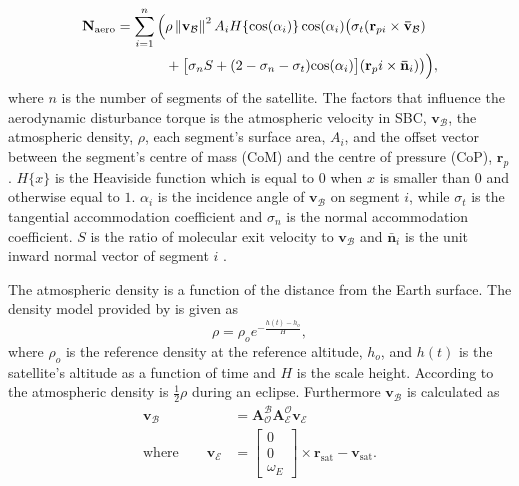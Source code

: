 \begin{equation}
\begin{aligned}
\mathbf{N}_{\text{aero}} = \sum_{i=1}^{n}\Big(& \rho \norm{\mathbf{v}_{\mathcal{B}}}^2 A_i H \{\text{cos}(\alpha_i)\} \, \text{cos}(\alpha_i) \big(\sigma_t (\mathbf{r}_{pi} \times \mathbf{\bar{v}}_{\mathcal{B}}) \\
					 & + \big[ \sigma_nS + (2 - \sigma_n - \sigma_t) \text{cos}(\alpha_i)\big] (\mathbf{r}_pi \times \mathbf{\bar{n}}_i) \big) \vphantom{\norm{\mathbf{v}_{\mathcal{B}}}^2}\Big),
\end{aligned}
\end{equation}
where $n$ is the number of segments of the satellite. The factors that influence the aerodynamic disturbance torque is the atmospheric velocity in SBC, $\mathbf{v}_{\mathcal{B}}$, the atmospheric density, $\rho$, each segment's surface area, $A_i$, and the offset vector between the segment's centre of mass (CoM) and the centre of pressure (CoP), $\mathbf{r}_p$. $H\{x\}$ is the Heaviside function which is equal to $0$ when $x$ is smaller than $0$ and otherwise equal to $1$. $\alpha_i$ is the incidence angle of $\mathbf{v}_{\mathcal{B}}$ on segment $i$, while $\sigma_t$ is the tangential accommodation coefficient and $\sigma_n$ is the normal accommodation coefficient. $S$ is the ratio of molecular exit velocity to $\mathbf{v}_{\mathcal{B}}$ and $\mathbf{\bar{n}}_i$ is the unit inward normal vector of segment $i$ \cite{JansevanVuuren2015}.

The atmospheric density is a function of the distance from the Earth surface. The density model provided by \cite{vallado2001fundamentals} is given as 
\begin{equation}
\rho = \rho_o e^{-\frac{h(t)-h_o}{H}},
\end{equation}
where $\rho_o$ is the reference density at the reference altitude, $h_o$, and $h(t)$ is the satellite's altitude as a function of time and $H$ is the scale height. According to \cite{steyn2011CubeSat} the atmospheric density is $\frac{1}{2}\rho$ during an eclipse. Furthermore $\mathbf{v}_{\mathcal{B}}$ is calculated as
\begin{equation}
\begin{aligned}
\mathbf{v}_{\mathcal{B}} &= \boldsymbol{A}^{\mathcal{B}}_{\mathcal{O}} \boldsymbol{A}_{\mathcal{E}}^{\mathcal{O}} \mathbf{v}_{\mathcal{E}} \\
\text{where}  \qquad \mathbf{v}_{\mathcal{E}} &= \begin{bmatrix} 0 \\ 0 \\ \omega_E \end{bmatrix} \times \mathbf{r}_{\text{sat}} - \mathbf{v}_{\text{sat}}.
\end{aligned}
\end{equation}

